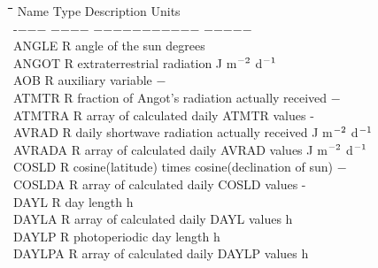 \documentclass[11pt]{article}
\begin{document}
\begin{tabbing}
\hspace{1.27cm}\=\hspace{1.27cm}\=\hspace{1.27cm}\=\hspace{1.27cm}\=%
\hspace{1.27cm}\=\hspace{1.27cm}\=\hspace{1.27cm}\=\hspace{1.27cm}\=%
\hspace{1.27cm}\=\hspace{1.27cm}\=\kill
Name    \> \> Type\> Description                    \> \> \> \> \>    \> \> Units\\
-$-$$-$$-$    \> \> $-$$-$$-$$-$\> $-$$-$$-$$-$$-$$-$$-$$-$$-$$-$$-$                \> \> \>           \> \> \> \> $-$$-$$-$$-$$-$\\
ANGLE   \> \> R   \> angle of the sun                          \> \> \> \> \> \> \> degrees\\
ANGOT\> \> R\> extraterrestrial radiation\> \> \> \> \> \> \> J m$^{{\rm -2}}$ d$^{{\rm -1}}$\\
AOB     \> \> R\> auxiliary variable                            \> \> \> \> \> \> \> $-$\\
ATMTR   \> \> R   \> fraction of Angot's radiation actually received    \> \> \> \> \> \> \> $-$\\
ATMTRA\> \> R\> array of calculated daily ATMTR values\> \> \> \> \> \> \> -\\
AVRAD\> \> R\> daily shortwave radiation actually received\> \> \> \> \> \> \> J m$^{{\rm -2}}$ d$^{{\rm -1}}$\\
AVRADA\> \> R\> array of calculated daily AVRAD values\> \> \> \> \> \> \> J m$^{{\rm -2}}$ d$^{{\rm -1}}$\\
COSLD   \> \> R  \> cosine(latitude) times cosine(declination of sun)\> \> \> \> \> \> \> $-$\\
COSLDA\> \> R\> array of calculated daily COSLD values\> \> \> \> \> \> \> -\\
DAYL \> \> R \> day length                              \> \> \> \> \> \> \> h\\
DAYLA\> \> R\> array of calculated daily DAYL values\> \> \> \> \> \> \> h\\
DAYLP   \> \> R \> photoperiodic day length                 \> \> \> \> \> \> \> h\\
DAYLPA\> \> R\> array of calculated daily DAYLP values\> \> \> \> \> \> \> h\\
$$
\end{tabbing}
\end{document}
